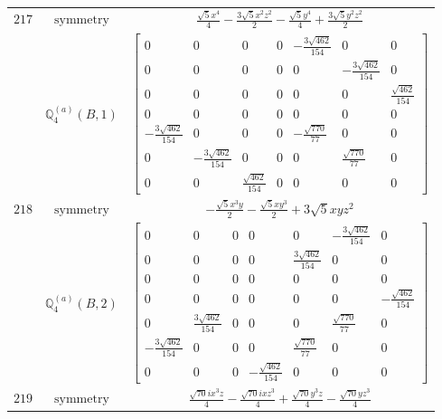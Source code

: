 \documentclass[fleqn,8pt,landscape]{jsarticle}
\begin{document}
\begin{longtable}{ccc}
$ 217 $ & $ \text{symmetry} $ & $ \frac{\sqrt{5} x^{4}}{4} - \frac{3 \sqrt{5} x^{2} z^{2}}{2} - \frac{\sqrt{5} y^{4}}{4} + \frac{3 \sqrt{5} y^{2} z^{2}}{2} $ \\
$  $ & $ \mathbb{Q}_{4}^{(a)}(B,1) $ & $ \begin{bmatrix} 0 & 0 & 0 & 0 & - \frac{3 \sqrt{462}}{154} & 0 & 0 \\ 0 & 0 & 0 & 0 & 0 & - \frac{3 \sqrt{462}}{154} & 0 \\ 0 & 0 & 0 & 0 & 0 & 0 & \frac{\sqrt{462}}{154} \\ 0 & 0 & 0 & 0 & 0 & 0 & 0 \\ - \frac{3 \sqrt{462}}{154} & 0 & 0 & 0 & - \frac{\sqrt{770}}{77} & 0 & 0 \\ 0 & - \frac{3 \sqrt{462}}{154} & 0 & 0 & 0 & \frac{\sqrt{770}}{77} & 0 \\ 0 & 0 & \frac{\sqrt{462}}{154} & 0 & 0 & 0 & 0 \end{bmatrix} $ \\ \hline
$ 218 $ & $ \text{symmetry} $ & $ - \frac{\sqrt{5} x^{3} y}{2} - \frac{\sqrt{5} x y^{3}}{2} + 3 \sqrt{5} x y z^{2} $ \\
$  $ & $ \mathbb{Q}_{4}^{(a)}(B,2) $ & $ \begin{bmatrix} 0 & 0 & 0 & 0 & 0 & - \frac{3 \sqrt{462}}{154} & 0 \\ 0 & 0 & 0 & 0 & \frac{3 \sqrt{462}}{154} & 0 & 0 \\ 0 & 0 & 0 & 0 & 0 & 0 & 0 \\ 0 & 0 & 0 & 0 & 0 & 0 & - \frac{\sqrt{462}}{154} \\ 0 & \frac{3 \sqrt{462}}{154} & 0 & 0 & 0 & \frac{\sqrt{770}}{77} & 0 \\ - \frac{3 \sqrt{462}}{154} & 0 & 0 & 0 & \frac{\sqrt{770}}{77} & 0 & 0 \\ 0 & 0 & 0 & - \frac{\sqrt{462}}{154} & 0 & 0 & 0 \end{bmatrix} $ \\ \hline
$ 219 $ & $ \text{symmetry} $ & $ \frac{\sqrt{70} i x^{3} z}{4} - \frac{\sqrt{70} i x z^{3}}{4} + \frac{\sqrt{70} y^{3} z}{4} - \frac{\sqrt{70} y z^{3}}{4} $ \\

\end{longtable}
\end{document}
